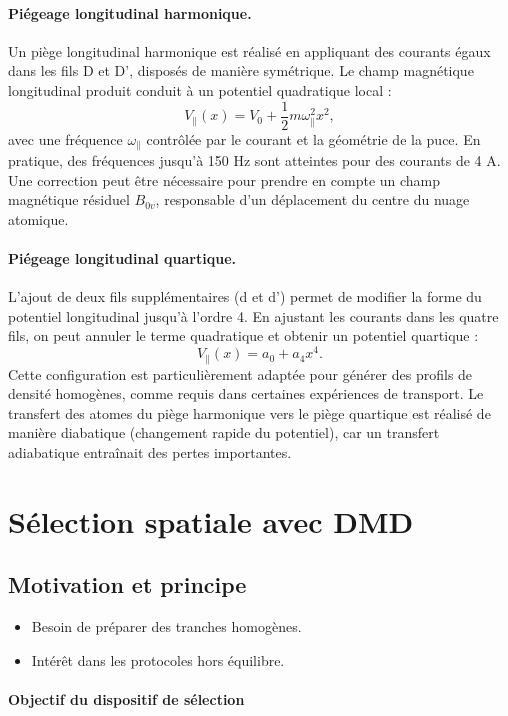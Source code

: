 \paragraph{Piégeage longitudinal harmonique.}
Un piège longitudinal harmonique est réalisé en appliquant des courants égaux dans les fils D et D', disposés de manière symétrique. Le champ magnétique longitudinal produit conduit à un potentiel quadratique local :
\[
V_\parallel(x) = V_0 + \frac{1}{2} m \omega_\parallel^2 x^2,
\]
avec une fréquence $\omega_\parallel$ contrôlée par le courant et la géométrie de la puce. En pratique, des fréquences jusqu’à 150 Hz sont atteintes pour des courants de 4 A. Une correction peut être nécessaire pour prendre en compte un champ magnétique résiduel $B_{0v}$, responsable d’un déplacement du centre du nuage atomique.

\paragraph{Piégeage longitudinal quartique.}
L’ajout de deux fils supplémentaires (d et d') permet de modifier la forme du potentiel longitudinal jusqu’à l’ordre 4. En ajustant les courants dans les quatre fils, on peut annuler le terme quadratique et obtenir un potentiel quartique :
\[
V_\parallel(x) = a_0 + a_4 x^4.
\]
Cette configuration est particulièrement adaptée pour générer des profils de densité homogènes, comme requis dans certaines expériences de transport. Le transfert des atomes du piège harmonique vers le piège quartique est réalisé de manière diabatique (changement rapide du potentiel), car un transfert adiabatique entraînait des pertes importantes.



\section{Sélection spatiale avec DMD}
\subsection{Motivation et principe}
{\color{blue}
\begin{itemize}
    \item Besoin de préparer des tranches homogènes.
    \item Intérêt dans les protocoles hors équilibre.
\end{itemize}
}

\paragraph{Objectif du dispositif de sélection}

